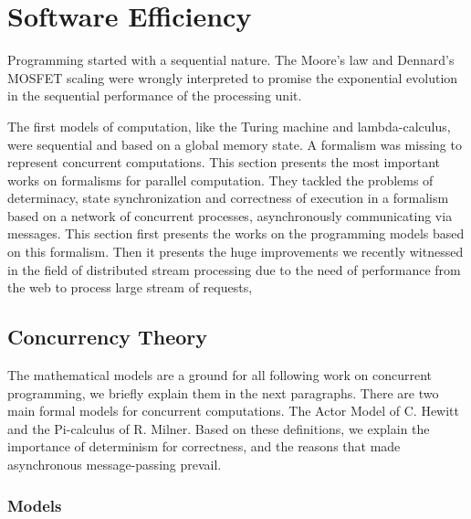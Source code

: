 \section{Software Efficiency} \label{chapter3:software-efficiency}

Programming started with a sequential nature.
The Moore's law \cite{Moore1965} and Dennard's MOSFET scaling \cite{Dennard2007} were wrongly interpreted to promise the exponential evolution in the sequential performance of the processing unit.


The first models of computation, like the Turing machine and lambda-calculus, were sequential and based on a global memory state.
A formalism was missing to represent concurrent computations.
This section presents the most important works on formalisms for parallel computation.
They tackled the problems of determinacy, state synchronization and correctness of execution in a formalism based on a network of concurrent processes, asynchronously communicating via messages.
This section first presents the works on the programming models based on this formalism.
Then it presents the huge improvements we recently witnessed in the field of distributed stream processing due to the need of performance from the web to process large stream of requests,

\subsection{Concurrency Theory} \label{chapter3:parallel-execution:concurrency-theory}

The mathematical models are a ground for all following work on concurrent programming, we briefly explain them in the next paragraphs.
There are two main formal models for concurrent computations.
The Actor Model of C. Hewitt and the Pi-calculus of R. Milner.
Based on these definitions, we explain the importance of determinism for correctness, and the reasons that made asynchronous message-passing prevail.


\subsubsection{Models}

